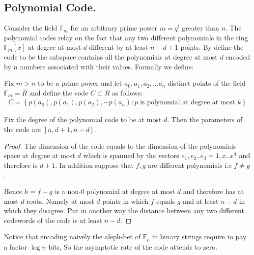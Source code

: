 \documentclass[manuscript,screen,review]{acmart}
\begin{document}
\subsection{Polynomial Code.} Consider the field $\mathbb{F}_{m}$ for an arbitrary prime power $m=q^{l}$ greater than $n$. The polynomial codes relay on the fact that any two different polynomials in the ring $\mathbb{F}_{m}\left[ x \right]$ at degree at most $d$ different by at least $n - d + 1$ points. By define the code to be the subspace contains all the polynomials at degree at most $d$ encoded by $n$ numbers associated with their values. Formally we define:     
\begin{definition}
  Fix $m > n $ to be a prime power and let $a_{0},a_{1},a_{2},\ldots a_{n}$ distinct points of the field $\mathbb{F}_{m} = R$  and define the code $C \subset R $ as follows:  
  \begin{equation*}
    \begin{split}
      C = \left\{p\left(a_{0}\right),p\left(a_{1}\right),p\left(a_{2}\right),\cdots p\left(a_{n}\right) : p \text{ is polynomial at degree at most } k \right\}
    \end{split}
  \end{equation*}
\end{definition}
\begin{lemma}
  Fix the degree of the polynomial code to be at most $d$. Then the parameters of the code are $[n,d + 1, n - d]$.  
  \label{polycode}
\end{lemma}
\begin{proof}
  The dimension of the code equals to the dimension of the polynomials space at degree at most $d$ which is spanned by the vectors $e_{1}, e_{2} .. e_{d} = 1, x .. x^{d}$ and therefore is $d+1$. In addition suppose that $f,g$ are different polynomials i.e $f\neq g$.

  Hence $h = f-g$ is a non-$0$ polynomial at degree at most $d$ and therefore has at most $d$ roots. Namely at most $d$ points in which $f$ equals $g$ and at least $n-d$ in which they disagree. Put in another way the distance between any two different codewords of the code is at least $n-d$.  
\end{proof}
Notice that encoding naively the aleph-bet of $\mathbb{F}_{p}$ in binary strings require to pay a factor $\log n$ bits, So the asymptotic rate of the code attends to zero.     
\end{document}
